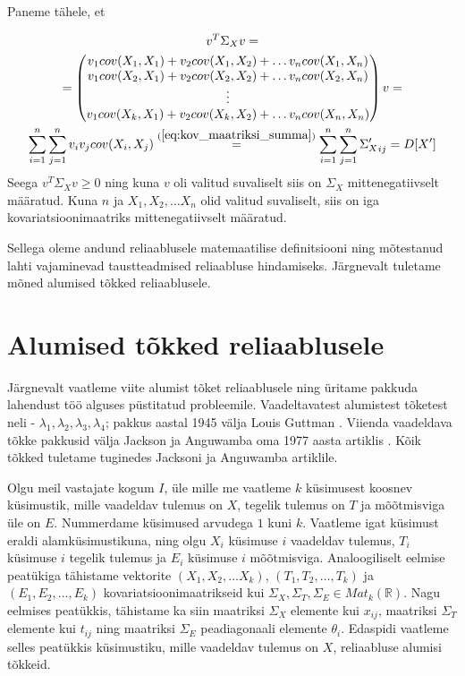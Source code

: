 \documentclass[a4paper,12pt,oneside]{article}
\numberwithin{equation}{section}
\theoremstyle{definition}
\begin{document}
Paneme tähele, et 

\begin{gather*}
v^T \Sigma_X v = \\
= \begin{pmatrix}
v_1 cov(X_1,X_1) + v_2 cov(X_1,X_2) + \hdots v_n cov(X_1,X_n) \\
v_1 cov(X_2,X_1) + v_2 cov(X_2,X_2) + \hdots v_n cov(X_2,X_n) \\
\vdots \\
v_1 cov(X_k,X_1) + v_2 cov(X_k,X_2) + \ldots v_n cov(X_n,X_n) \\
\end{pmatrix} v = \\  \sum \limits_{i=1}^n \sum \limits_{j=1}^n v_i v_j cov(X_i,X_j)  \overset{(\ref{eq:kov_maatriksi_summa})}{=} \sum \limits_{i=1}^n \sum \limits_{j=1}^n {\Sigma_X'}_{ij} = D[X']
\end{gather*}
Seega $v^T \Sigma_X v \geq 0$ ning kuna $v$ oli valitud suvaliselt siis on $\Sigma_X$ mittenegatiivselt määratud. Kuna $n$ ja $X_1,X_2,\ldots X_n$ olid valitud suvaliselt, siis on iga kovariatsioonimaatriks mittenegatiivselt määratud. 

Sellega oleme andund reliaablusele matemaatilise definitsiooni ning mõtestanud lahti vajaminevad taustteadmised reliaabluse hindamiseks. Järgnevalt tuletame mõned alumised tõkked reliaablusele.   

  


\section{Alumised tõkked reliaablusele}

Järgnevalt vaatleme viite alumist tõket reliaablusele ning üritame pakkuda lahendust töö alguses püstitatud probleemile. Vaadeltavatest alumistest tõketest neli - $\lambda_1,\lambda_2,\lambda_3,\lambda_4$; pakkus aastal 1945 välja Louis Guttman \cite{Guttman1945}. Viienda vaadeldava tõkke pakkusid välja Jackson ja Anguwamba oma 1977 aasta artiklis \cite{Jackson1977}. Kõik tõkked tuletame tuginedes Jacksoni ja Anguwamba artiklile.

Olgu meil vastajate kogum $I$, üle mille me vaatleme $k$ küsimusest koosnev küsimustik, mille vaadeldav tulemus on $X$, tegelik tulemus on $T$ ja mõõtmisviga üle on $E$. Nummerdame küsimused arvudega $1$ kuni $k$. Vaatleme igat küsimust eraldi alamküsimustikuna, ning olgu $X_i$ küsimuse $i$ vaadeldav tulemus, $T_i$ küsimuse $i$ tegelik tulemus ja $E_i$ küsimuse $i$ mõõtmisviga. Analoogiliselt eelmise peatükiga tähistame vektorite $(X_1,X_2,\ldots X_k)$, $(T_1,T_2,\ldots,T_k)$ ja $(E_1,E_2,\ldots,E_k)$ kovariatsioonimaatrikseid kui $\Sigma_X,\Sigma_T,\Sigma_E \in Mat_{k}\left(\mathbb{R}\right)$. Nagu eelmises peatükkis, tähistame ka siin maatriksi $\Sigma_X$ elemente kui $x_{ij}$, maatriksi $\Sigma_T$ elemente kui $t_{ij}$ ning maatriksi $\Sigma_E$ peadiagonaali elemente $\theta_i$. Edaspidi vaatleme selles peatükkis küsimustiku, mille vaadeldav tulemus on $X$, reliaabluse alumisi tõkkeid.
\end{document}

